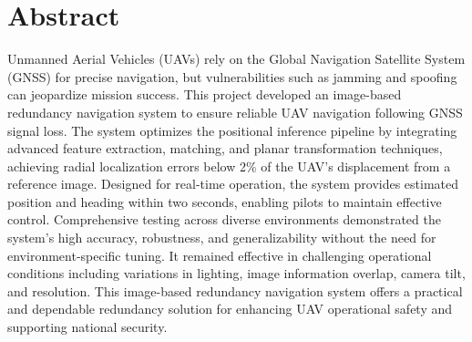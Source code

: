 \chapter*{Abstract}
\makeatletter{}\makeatother



Unmanned Aerial Vehicles (UAVs) rely on the Global Navigation Satellite System (GNSS) for precise navigation, but vulnerabilities such as jamming and spoofing can jeopardize mission success. This project developed an image-based redundancy navigation system to ensure reliable UAV navigation following GNSS signal loss. The system optimizes the positional inference pipeline by integrating advanced feature extraction, matching, and planar transformation techniques, achieving radial localization errors below 2\% of the UAV's displacement from a reference image. Designed for real-time operation, the system provides estimated position and heading within two seconds, enabling pilots to maintain effective control. Comprehensive testing across diverse environments demonstrated the system's high accuracy, robustness, and generalizability without the need for environment-specific tuning. It remained effective in challenging operational conditions including variations in lighting, image information overlap, camera tilt, and resolution. This image-based redundancy navigation system offers a practical and dependable redundancy solution for enhancing UAV operational safety and supporting national security.










